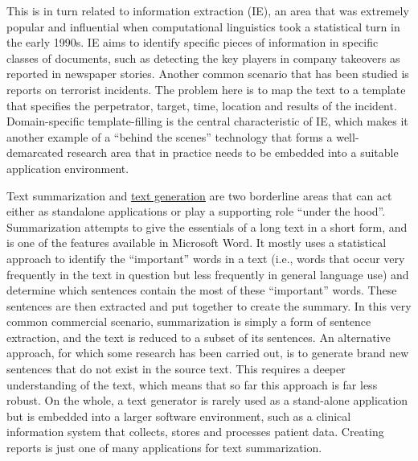 \documentclass[]{../../metanetpaper}
\begin{document}
\begin{Parallel}[c]{70mm}{70mm}
{This is in turn related to information extraction (IE), an area that was
extremely popular and influential when computational linguistics took a
statistical turn in the early 1990s. IE aims to identify specific pieces of
information in specific classes of documents, such as detecting the key players
in company takeovers as reported in newspaper stories. Another common scenario
that has been studied is reports on terrorist incidents. The problem here is to
map the text to a template that specifies the perpetrator, target, time,
location and results of the incident. Domain-specific template-filling is the
central characteristic of IE, which makes it another example of a “behind the
scenes” technology that forms a well-demarcated research area that in practice
needs to be embedded into a suitable application environment.


Text summarization and \underline{text generation} are two borderline areas that can act
either as standalone applications or play a supporting role “under the hood”.
Summarization attempts to give the essentials of a long text in a short form,
and is one of the features available in Microsoft Word. It mostly uses a
statistical approach to identify the “important” words in a text (i.e., words
that occur very frequently in the text in question but less frequently in
general language use) and determine which sentences contain the most of these
“important” words. These sentences are then extracted and put together to
create the summary. In this very common commercial scenario, summarization is
simply a form of sentence extraction, and the text is reduced to a subset of
its sentences. An alternative approach, for which some research has been
carried out, is to generate brand new sentences that do not exist in the source
text. This requires a deeper understanding of the text, which means that so far
this approach is far less robust. On the whole, a text generator is rarely used
as a stand-alone application but is embedded into a larger software
environment, such as a clinical information system that collects, stores and
processes patient data. Creating reports is just one of many applications for
text summarization.

}
\end{Parallel}
\end{document}
